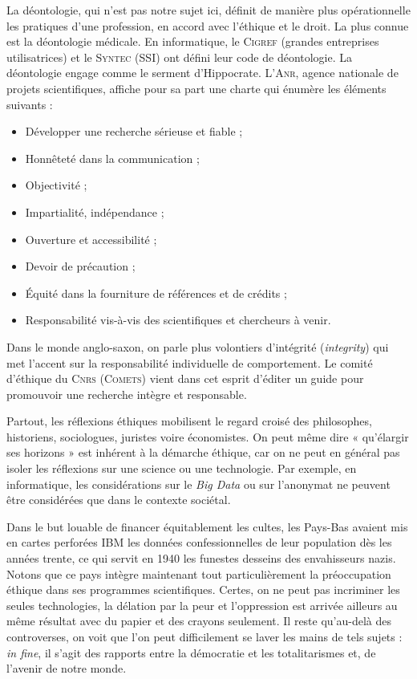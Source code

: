 La déontologie, qui n’est pas notre sujet ici, définit de manière plus opérationnelle les pratiques d’une profession, en accord avec l’éthique et le droit. La plus connue est la déontologie médicale. En informatique, le \textsc{Cigref} (grandes entreprises utilisatrices) et le \textsc{Syntec} (SSI) ont défini leur code de déontologie. La déontologie engage comme le serment d’Hippocrate. L’\textsc{Anr}, agence nationale de projets scientifiques, affiche pour sa part une charte qui énumère les éléments suivants :
\setlength{\columnsep}{12pt}
\begin{multicols}{2}
\begin{itemize}
\item Développer une recherche sérieuse et fiable ; 
\item Honnêteté dans la communication ; 
\item Objectivité ; 
\item Impartialité, indépendance ; 
\item Ouverture et accessibilité ; 
\item Devoir de précaution ; 
\item Équité dans la fourniture de références et de crédits ; 
\item Responsabilité vis-à-vis des scientifiques et chercheurs à venir.
\end{itemize}
\end{multicols}

Dans le monde anglo-saxon, on parle plus volontiers d’intégrité (\textit{integrity}) qui met l’accent sur la responsabilité individuelle de comportement. Le comité d’éthique du \textsc{Cnrs} (\textsc{Comets}) vient dans cet esprit d’éditer un guide pour promouvoir une recherche intègre et responsable.


Partout, les réflexions éthiques mobilisent le regard croisé des philosophes, historiens, sociologues, juristes voire économistes. On peut même dire « qu’élargir ses horizons » est inhérent à la démarche éthi\-que, car on ne peut en général pas isoler les réflexions sur une science ou une technologie. Par exemple, en informatique, les considérations sur le \textit{Big Data} ou sur l’anonymat ne peuvent être considérées que dans le contexte sociétal.


Dans le but louable de financer équitablement les cultes, les Pays-Bas avaient mis en cartes perforées IBM les données confessionnelles de leur population dès les années trente, ce qui servit en 1940 les funestes desseins des envahisseurs nazis. Notons que ce pays intègre maintenant tout particulièrement la préoccupation éthique dans ses programmes scientifiques. Certes, on ne peut pas incriminer les seules technologies, la délation par la peur et l’oppression est arrivée ailleurs au même résultat avec du papier et des crayons seulement. Il reste qu’au-delà des controverses, on voit que l’on peut difficilement se laver les mains de tels sujets : \textit{in fine}, il s’agit des rapports entre la démocratie et les totalitarismes et, de l’avenir de notre monde.


